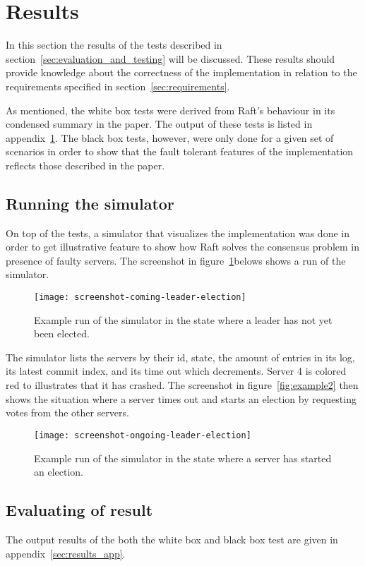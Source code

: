 \section{Results}
\label{sec:results}

In this section the results of the tests described in section~\ref{sec:evaluation_and_testing} will be discussed. These results should provide knowledge about the correctness of the implementation in relation to the requirements specified in section~\ref{sec:requirements}.

As mentioned, the white box tests were derived from Raft's behaviour in its condensed summary in the paper. The output of these tests is listed in appendix~\ref{sec:results}.
The black box tests, however, were only done for a given set of scenarios in order to show that the fault tolerant features of the implementation reflects those described in the paper.

\subsection{Running the simulator}
On top of the tests, a simulator that visualizes the implementation was done in order to get illustrative feature to show how Raft solves the consensus problem in presence of faulty servers. The screenshot in figure~\ref{fig:example1}belows shows a run of the simulator.

\begin{figure}[H]
\centering
\texttt{[image: screenshot-coming-leader-election]}
\caption{Example run of the simulator in the state where a leader has not yet been elected.}
\label{fig:example1}
\end{figure}

The simulator lists the servers by their id, state, the amount of entries in its log, its latest commit index, and its time out which decrements. Server 4 is colored red to illustrates that it has crashed.
The screenshot in figure~\ref{fig:example2} then shows the situation where a server times out and starts an election by requesting votes from the other servers.

\begin{figure}[H]
\centering
\texttt{[image: screenshot-ongoing-leader-election]}
\caption{Example run of the simulator in the state where a server has started an election.}
\label{fig:example}
\end{figure}

\subsection{Evaluating of result}
The output results of the both the white box and black box test are given in appendix~\ref{sec:results_app}. 